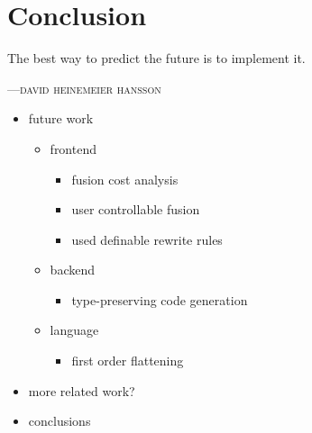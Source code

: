 %
%

\chapter{Conclusion}
\epigraph{The best way to predict the future is to implement it.}
{\textsc{---david heinemeier hansson}}

\begin{itemize}
    \item future work
        \begin{itemize}
            \item frontend
                \begin{itemize}
                    \item fusion cost analysis
                    \item user controllable fusion
                    \item used definable rewrite rules
                \end{itemize}
            \item backend
                \begin{itemize}
                    \item type-preserving code generation
                \end{itemize}
            \item language
                \begin{itemize}
                    \item first order flattening
                \end{itemize}
        \end{itemize}

    \item more related work?

    \item conclusions

\end{itemize}

